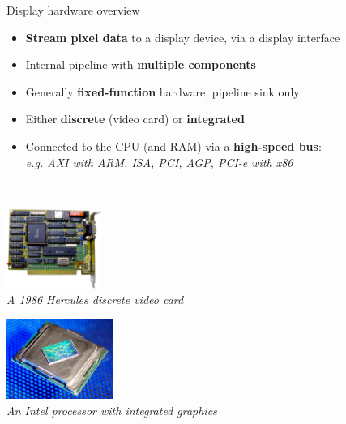 \begin{frame}{Display hardware overview}
  \begin{itemize}
  \item \textbf{Stream pixel data} to a display device, via a display interface
  \item Internal pipeline with \textbf{multiple components}
  \item Generally \textbf{fixed-function} hardware, pipeline sink only
  \item Either \textbf{discrete} (video card) or \textbf{integrated}
  \item Connected to the CPU (and RAM) via a \textbf{high-speed bus}:\\
  \textit{e.g. AXI with ARM, ISA, PCI, AGP, PCI-e with x86}
  \end{itemize}~

  \begin{minipage}[t]{0.45\textwidth}
    \centering
    \includegraphics[height=7em]{slides/graphics-introduction/ati-hercules-1986.png}\\
    \textit{\small A 1986 Hercules discrete video card}
  \end{minipage}
  \hfill
  \begin{minipage}[t]{0.45\textwidth}
    \centering
    \includegraphics[height=7em]{slides/graphics-introduction/intel-skylake.jpg}\\
    \textit{\small An Intel processor with integrated graphics}
  \end{minipage}
\end{frame}

